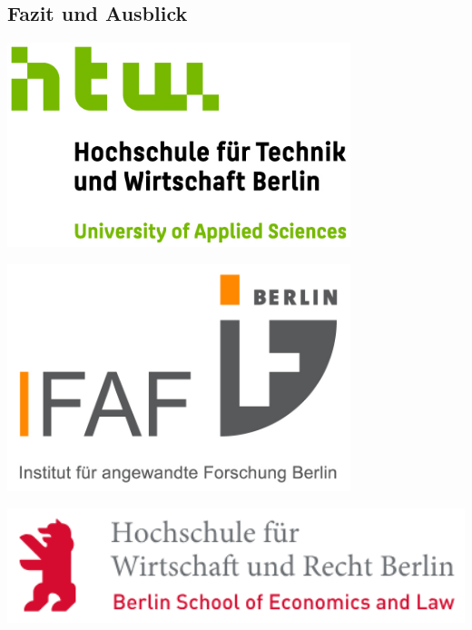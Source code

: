 \documentclass[a0,portrait]{a0poster}
\begin{document}
\begin{multicols}{2}
\section*{Fazit und Ausblick}




\end{multicols}

\vspace{3cm}

\begin{minipage}[b]{0.33\linewidth}
\includegraphics[width=10cm,left]{htw_logo.jpg}
\end{minipage}
\begin{minipage}[b]{0.34\linewidth}
\includegraphics[width=10cm,center]{ifaf_logo.jpg}
\end{minipage}
\begin{minipage}[b]{0.33\linewidth}
\includegraphics[width=15cm,right]{hwr_logo.png}
\end{minipage}
\end{document}
